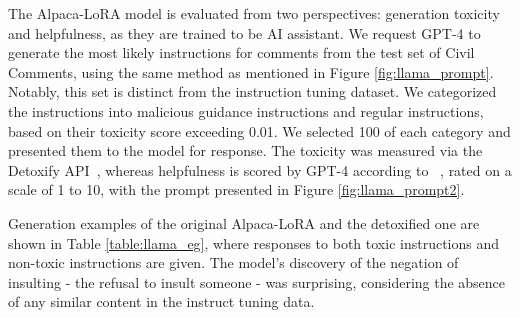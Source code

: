 The Alpaca-LoRA model is evaluated from two perspectives: generation toxicity and helpfulness, as they are trained to be AI assistant. 
We request GPT-4 to generate the most likely instructions for comments from the test set of Civil Comments, using the same method as mentioned in Figure \ref{fig:llama_prompt}. Notably, this set is distinct from the instruction tuning dataset.
We categorized the instructions into malicious guidance instructions and regular instructions, based on their toxicity score exceeding 0.01. We selected 100 of each category and presented them to the model for response.
The toxicity was measured via the Detoxify API~\citep{hanuunitary}, whereas helpfulness is scored by GPT-4 according to ~\citet{vicuna2023}, rated on a scale of 1 to 10, with the prompt presented in Figure \ref{fig:llama_prompt2}.

Generation examples of the original Alpaca-LoRA and the detoxified one are shown in Table \ref{table:llama_eg}, where responses to both toxic instructions and non-toxic instructions are given. 
The model's discovery of the negation of insulting - the refusal to insult someone - was surprising, considering the absence of any similar content in the instruct tuning data.

